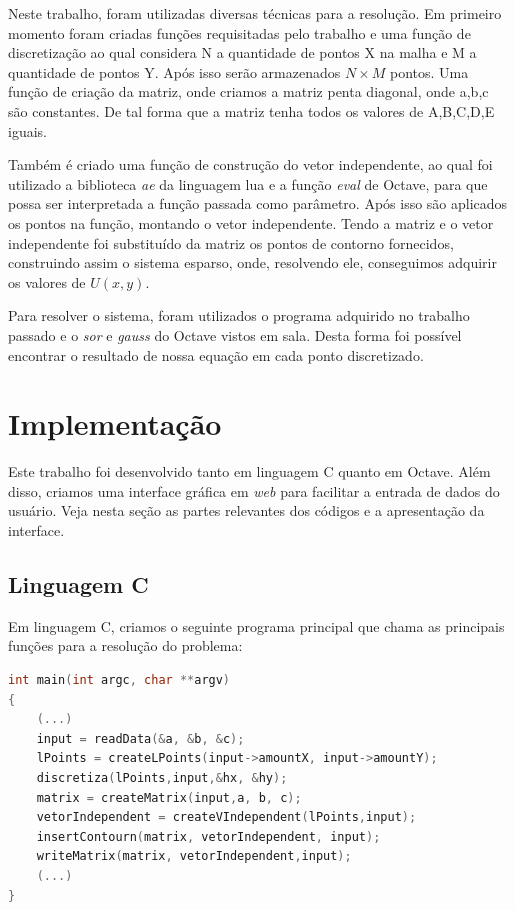 \documentclass[
	11pt,				%
	oneside,			%
	a4paper,			%
	english,			%
	brazil,				%
	]{article}
\begin{document}
Neste trabalho, foram utilizadas diversas técnicas para a resolução. Em primeiro momento foram criadas funções requisitadas pelo trabalho e uma função de discretização ao qual considera N a quantidade de pontos X na malha e M a quantidade de pontos Y. Após isso serão armazenados $N \times M$ pontos. Uma função de criação da matriz, onde criamos a matriz penta diagonal, onde a,b,c são constantes. De tal forma que a matriz tenha todos os valores de A,B,C,D,E iguais.

Também é criado uma função de construção do vetor independente, ao qual foi utilizado a biblioteca \textit{ae} da linguagem lua e a função \textit{eval} de Octave, para que possa ser interpretada a função passada como parâmetro. Após isso são aplicados os pontos na função, montando o vetor independente. Tendo a matriz e o vetor independente foi substituído da matriz os pontos de contorno fornecidos, construindo assim o sistema esparso, onde, resolvendo ele, conseguimos adquirir os valores de $U(x,y)$.

Para resolver o sistema, foram utilizados o programa adquirido no trabalho passado e o \textit{sor} e \textit{gauss} do Octave vistos em sala. Desta forma foi possível encontrar o resultado de nossa equação em cada ponto discretizado.

\section{Implementação}
Este trabalho foi desenvolvido tanto em linguagem C quanto em Octave. Além disso, criamos uma interface gráfica em \textit{web} para facilitar a entrada de dados do usuário. Veja nesta seção as partes relevantes dos códigos e a apresentação da interface.

\subsection{Linguagem C}
Em linguagem C, criamos o seguinte programa principal que chama as principais funções para a resolução do problema:

\begin{lstlisting}[language=C, caption=Função \textit{main}]
int main(int argc, char **argv)
{
	(...)
	input = readData(&a, &b, &c);
	lPoints = createLPoints(input->amountX, input->amountY);
	discretiza(lPoints,input,&hx, &hy);
	matrix = createMatrix(input,a, b, c);
	vetorIndependent = createVIndependent(lPoints,input);
	insertContourn(matrix, vetorIndependent, input);
	writeMatrix(matrix, vetorIndependent,input);
	(...)
}
\end{lstlisting}
\end{document}
